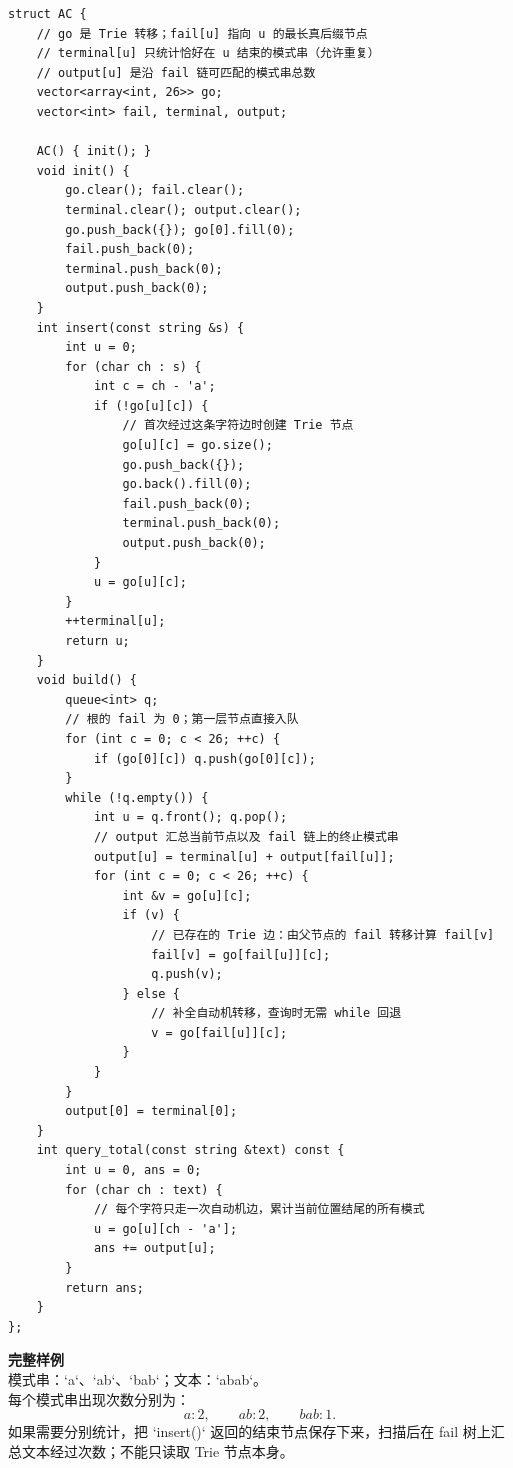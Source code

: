 \begin{lstlisting}[style=cpp]
struct AC {
    // go 是 Trie 转移；fail[u] 指向 u 的最长真后缀节点
    // terminal[u] 只统计恰好在 u 结束的模式串（允许重复）
    // output[u] 是沿 fail 链可匹配的模式串总数
    vector<array<int, 26>> go;
    vector<int> fail, terminal, output;

    AC() { init(); }
    void init() {
        go.clear(); fail.clear();
        terminal.clear(); output.clear();
        go.push_back({}); go[0].fill(0);
        fail.push_back(0);
        terminal.push_back(0);
        output.push_back(0);
    }
    int insert(const string &s) {
        int u = 0;
        for (char ch : s) {
            int c = ch - 'a';
            if (!go[u][c]) {
                // 首次经过这条字符边时创建 Trie 节点
                go[u][c] = go.size();
                go.push_back({});
                go.back().fill(0);
                fail.push_back(0);
                terminal.push_back(0);
                output.push_back(0);
            }
            u = go[u][c];
        }
        ++terminal[u];
        return u;
    }
    void build() {
        queue<int> q;
        // 根的 fail 为 0；第一层节点直接入队
        for (int c = 0; c < 26; ++c) {
            if (go[0][c]) q.push(go[0][c]);
        }
        while (!q.empty()) {
            int u = q.front(); q.pop();
            // output 汇总当前节点以及 fail 链上的终止模式串
            output[u] = terminal[u] + output[fail[u]];
            for (int c = 0; c < 26; ++c) {
                int &v = go[u][c];
                if (v) {
                    // 已存在的 Trie 边：由父节点的 fail 转移计算 fail[v]
                    fail[v] = go[fail[u]][c];
                    q.push(v);
                } else {
                    // 补全自动机转移，查询时无需 while 回退
                    v = go[fail[u]][c];
                }
            }
        }
        output[0] = terminal[0];
    }
    int query_total(const string &text) const {
        int u = 0, ans = 0;
        for (char ch : text) {
            // 每个字符只走一次自动机边，累计当前位置结尾的所有模式
            u = go[u][ch - 'a'];
            ans += output[u];
        }
        return ans;
    }
};
\end{lstlisting}

\begin{card}
\textbf{完整样例}\\
模式串：`a`、`ab`、`bab`；文本：`abab`。\\
每个模式串出现次数分别为：
\[
a:2,\qquad ab:2,\qquad bab:1.
\]
如果需要分别统计，把 `insert()` 返回的结束节点保存下来，扫描后在 fail 树上汇总文本经过次数；不能只读取 Trie 节点本身。
\end{card}

